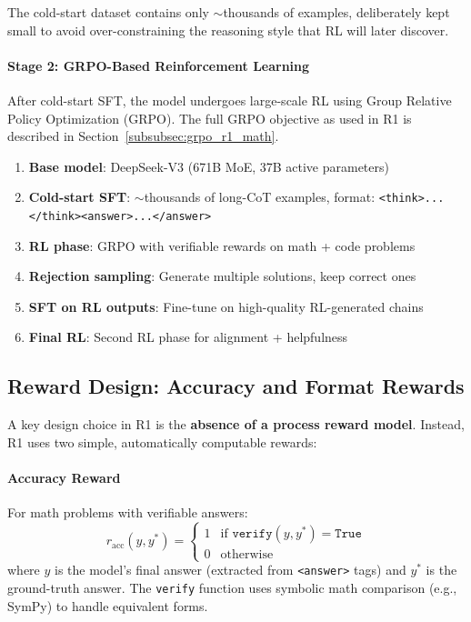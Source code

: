 The cold-start dataset contains only $\sim$thousands of examples, deliberately kept small to avoid over-constraining the reasoning style that RL will later discover.

\paragraph{Stage 2: GRPO-Based Reinforcement Learning}
\label{stage-2-grpo-based-reinforcement-learning}

After cold-start SFT, the model undergoes large-scale RL using Group Relative Policy Optimization (GRPO). The full GRPO objective as used in R1 is described in Section~\ref{subsubsec:grpo_r1_math}.

\newpage
\begin{keybox}
\begin{enumerate}
  \item \textbf{Base model}: DeepSeek-V3 (671B MoE, 37B active parameters)
  \item \textbf{Cold-start SFT}: $\sim$thousands of long-CoT examples, format: \texttt{<think>...</think><answer>...</answer>}
  \item \textbf{RL phase}: GRPO with verifiable rewards on math + code problems
  \item \textbf{Rejection sampling}: Generate multiple solutions, keep correct ones
  \item \textbf{SFT on RL outputs}: Fine-tune on high-quality RL-generated chains
  \item \textbf{Final RL}: Second RL phase for alignment + helpfulness
\end{enumerate}
\end{keybox}

\subsection{Reward Design: Accuracy and Format Rewards}
\label{reward-design-accuracy-and-format-rewards}

A key design choice in R1 is the \textbf{absence of a process reward model}. Instead, R1 uses two simple, automatically computable rewards:

\paragraph{Accuracy Reward}
\label{accuracy-reward}

For math problems with verifiable answers: 
\begin{equation}
    r_{\text{acc}}(y, y^*) = \begin{cases} 1 & \text{if } \texttt{verify}(y, y^*) = \texttt{True} \\ 0 & \text{otherwise} \end{cases}
\end{equation}
 where $y$ is the model’s final answer (extracted from \texttt{<answer>} tags) and $y^*$ is the ground-truth answer. The \texttt{verify} function uses symbolic math comparison (e.g., SymPy) to handle equivalent forms.

